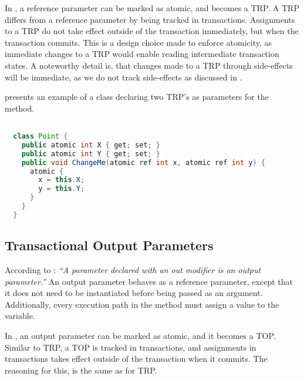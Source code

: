 In \stmnamesp, a reference parameter can be marked as atomic, and becomes a \ac{TRP}. A \ac{TRP} differs from a reference parameter by being tracked in transactions. Assignments to a \ac{TRP} do not take effect outside of the transaction immediately, but when the transaction commits. This is a design choice made to enforce atomicity, as immediate changes to a \ac{TRP} would enable reading intermediate transaction states. A noteworthy detail is, that changes made to a \ac{TRP} through side-effects will be immediate, as we do not track side-effects as discussed in .

 presents an example of a  class declaring two \ac{TRP}'s as parameters for the  method.

\begin{lstlisting}[label=lst:atomic_ref,
  caption={Transactional Reference Parameter},
  language=Java,  
  showspaces=false,
  showtabs=false,
  breaklines=true,
  showstringspaces=false,
  breakatwhitespace=true,
  commentstyle=\color{greencomments},
  keywordstyle=\color{bluekeywords},
  stringstyle=\color{redstrings},
  morekeywords={atomic, retry, orElse, var, get, set}]  % Start your code-block

  class Point {
    public atomic int X { get; set; }
    public atomic int Y { get; set; }
    public void ChangeMe(atomic ref int x, atomic ref int y) {
      atomic { 
        x = this.X;
        y = this.Y;
      }
    }    
  }
\end{lstlisting}

\subsection{Transactional Output Parameters}
\label{subsec:stm_desgin_out_parameters}
According to \cite[p. 97]{csharp2013specificaiton}: \textit{``A parameter declared with an out modifier is an output parameter.''} An output parameter behaves as a reference parameter, except that it does not need to be instantiated before being passed as an argument. Additionally, every execution path in the method must assign a value to the variable\cite[p. 42]{sestoft2011c}. 

In \stmname, an output parameter can be marked as atomic, and it becomes a \ac{TOP}. Similar to \ac{TRP}, a \ac{TOP} is tracked in transactions, and assignments in transactions takes effect outside of the transaction when it commits. The reasoning for this, is the same as for \ac{TRP}.

